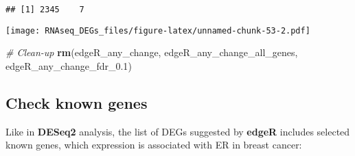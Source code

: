 \documentclass[]{book}
\newenvironment{Shaded}{\begin{snugshade}}{\end{snugshade}}
\newcommand{\KeywordTok}[1]{\textcolor[rgb]{0.13,0.29,0.53}{\textbf{#1}}}
\newcommand{\DataTypeTok}[1]{\textcolor[rgb]{0.13,0.29,0.53}{#1}}
\newcommand{\FloatTok}[1]{\textcolor[rgb]{0.00,0.00,0.81}{#1}}
\newcommand{\StringTok}[1]{\textcolor[rgb]{0.31,0.60,0.02}{#1}}
\newcommand{\CommentTok}[1]{\textcolor[rgb]{0.56,0.35,0.01}{\textit{#1}}}
\newcommand{\OperatorTok}[1]{\textcolor[rgb]{0.81,0.36,0.00}{\textbf{#1}}}
\newcommand{\NormalTok}[1]{#1}
\begin{document}
\begin{Shaded}
\end{Shaded}

\begin{verbatim}
## [1] 2345    7
\end{verbatim}

\begin{Shaded}
\end{Shaded}

\texttt{[image: RNAseq\_DEGs\_files/figure-latex/unnamed-chunk-53-2.pdf]}

\begin{Shaded}
\begin{Highlighting}[]
\CommentTok{# Clean-up}
\KeywordTok{rm}\NormalTok{(edgeR_any_change, edgeR_any_change_all_genes, edgeR_any_change_fdr_}\FloatTok{0.1}\NormalTok{)}
\end{Highlighting}
\end{Shaded}

\subsection{Check known genes}\label{check-known-genes-1}

Like in \textbf{DESeq2} analysis, the list of DEGs suggested by
\textbf{edgeR} includes selected known genes, which expression is
associated with ER in breast cancer:
\end{document}
